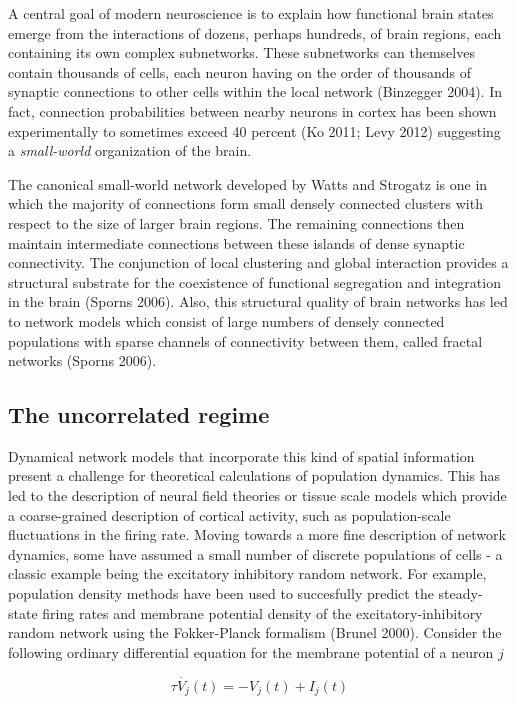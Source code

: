 \documentclass{ucetd}
\begin{document}
A central goal of modern neuroscience is to explain how functional brain states emerge from the interactions of dozens, perhaps hundreds, of brain regions, each containing its own complex subnetworks.  These subnetworks can themselves contain thousands of cells, each neuron having on the order of thousands of synaptic connections to other cells within the local network (Binzegger 2004). In fact, connection probabilities between nearby neurons in cortex has been shown experimentally to sometimes exceed 40 percent (Ko 2011; Levy 2012) suggesting a \emph{small-world} organization of the brain. 

The canonical small-world network developed by Watts and Strogatz is one in which the majority of connections form small densely connected clusters with respect to the size of larger brain regions.  The remaining connections then maintain intermediate connections between these islands of dense synaptic connectivity. The conjunction of local clustering and global interaction provides a structural substrate for the coexistence of functional segregation and integration in the brain (Sporns 2006). Also, this structural quality of brain networks has led to network models which consist of large numbers of densely connected populations with sparse channels of connectivity between them, called fractal networks (Sporns 2006).


\subsection{The uncorrelated regime}

Dynamical network models that incorporate this kind of spatial information present a challenge for theoretical calculations of population dynamics. This has led to the description of neural field theories or tissue scale models which provide a coarse-grained description of cortical activity, such as population-scale fluctuations in the firing rate. Moving towards a more fine description of network dynamics, some have assumed a small number of discrete populations of cells - a classic example being the excitatory inhibitory random network. For example, population density methods have been used to succesfully predict the steady-state firing rates and membrane potential density of the excitatory-inhibitory random network using the Fokker-Planck formalism (Brunel 2000). Consider the following ordinary differential equation for the membrane potential of a neuron $j$

\begin{equation}
\tau\dot{V_{j}}(t) = -V_{j}(t) + I_{j}(t)
\end{equation}
\end{document}
